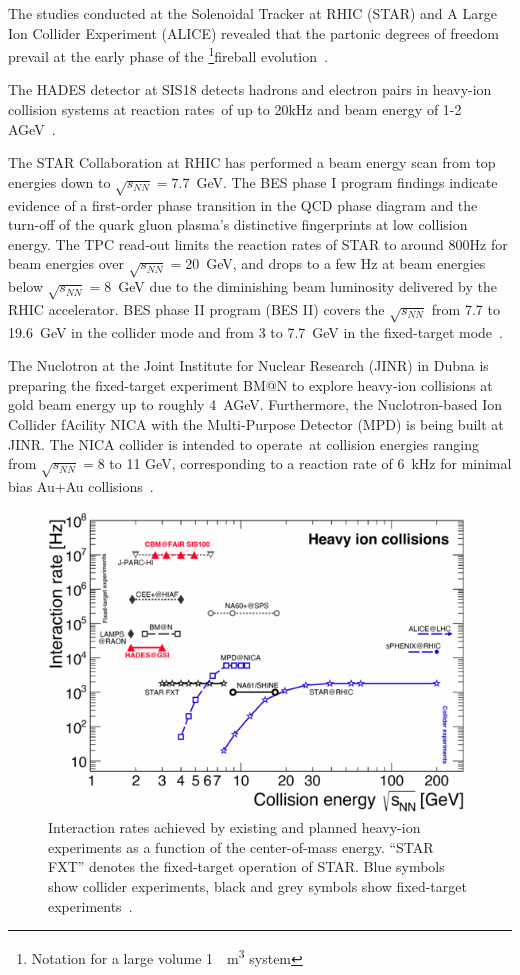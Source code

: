 The studies conducted at the Solenoidal Tracker at \gls{RHIC} (\gls{STAR}) and A Large Ion Collider Experiment (\gls{ALICE}) revealed that the partonic degrees of freedom prevail at the early phase of the \footnote{Notation for a large volume \SI{1}{\femto\cubic\metre} system}{fireball} evolution~\cite{CBM_physics}.

The HADES detector at SIS18 detects hadrons and electron pairs in heavy-ion collision systems at reaction rates of up to 20kHz and beam energy of 1-2 AGeV~\cite{Ablyazimov_2017}.


The STAR Collaboration at \gls{RHIC} has
performed a beam energy scan from top energies down
to $\sqrt{s_{NN}} = 7.7$~GeV. The BES phase I program findings indicate evidence of a first-order phase transition in the QCD phase diagram and the turn-off of the quark gluon plasma's distinctive fingerprints at low collision energy. The TPC read-out limits the reaction rates of STAR to around 800Hz for beam energies over $\sqrt{s_{NN}} = 20$~GeV, and drops to a few Hz at beam energies below $\sqrt{s_{NN}} = 8$~GeV due to the diminishing beam luminosity delivered by the \gls{RHIC} accelerator. BES phase II program (BES II) covers the $\sqrt{s_{NN}}$ from 7.7 to 19.6~GeV in the collider mode and from 3 to 7.7~GeV in the fixed-target mode~\cite{STAR2, STAR1}.

The Nuclotron at the Joint Institute for Nuclear Research (JINR) in Dubna is preparing the fixed-target experiment BM@N to explore heavy-ion collisions at gold beam energy up to roughly 4~AGeV. Furthermore, the Nuclotron-based Ion Collider fAcility NICA with the Multi-Purpose Detector (MPD) is being built at JINR. The NICA collider is intended to operate at collision energies ranging from $\sqrt{s_{NN}} = 8$ to 11 GeV, corresponding to a reaction rate of 6~kHz for minimal bias Au+Au collisions~\cite{Ablyazimov_2017}.

\begin{figure}[!h]
    \centering
    \includegraphics[width=0.7\columnwidth]{Chapter1/images/interaction_rates.png}
    \caption{Interaction rates achieved by existing and planned heavy-ion experiments as a function of the center-of-mass energy. “STAR FXT” denotes the fixed-target operation of STAR.  Blue symbols show collider experiments, black and grey
symbols show fixed-target experiments~\cite{Ablyazimov_2017}.}
    \label{fig:cbm_rates}
\end{figure}




